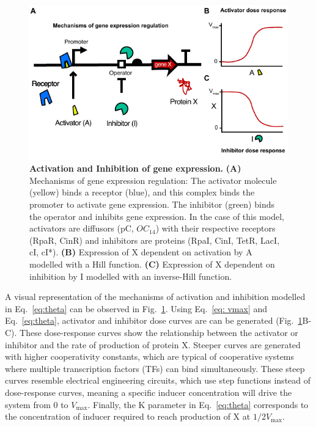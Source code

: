 \begin{figure}[H] %
    \centering
    \begin{adjustbox}{center}
        \includegraphics[width=1\textwidth]{chapters/Chapter 2/activation_inhibition2} %
    \end{adjustbox}
    \caption{\textbf{Activation and Inhibition of gene expression.} \textbf{(A)} Mechanisms of gene expression regulation:
    The activator molecule (yellow) binds a receptor (blue),
        and this complex binds the promoter to activate gene expression.
    The inhibitor (green) binds the operator and inhibits gene expression.
    In the case of this model, activators are diffusors (pC, $OC_{14}$) with their respective receptors (RpaR, CinR) and inhibitors are proteins (RpaI, CinI, TetR, LacI, cI, cI*).
    \textbf{(B)} Expression of X dependent on activation by A modelled with a Hill function.
    \textbf{(C)} Expression of X dependent on inhibition by I modelled with an inverse-Hill function.}
    \label{fig:activation_inhibition} %
\end{figure}

A visual representation of the mechanisms of activation and inhibition
modelled in Eq.~\ref{eq:theta} can be observed in Fig.~\ref{fig:activation_inhibition}.
Using Eq.~\ref{eq: vmax} and Eq.~\ref{eq:theta}, activator and inhibitor dose curves are can be generated
(Fig.~\ref{fig:activation_inhibition}B-C).
These dose-response curves show the relationship between the activator or inhibitor and the rate of production of protein X.
Steeper curves are generated with higher cooperativity constants,
which are typical of cooperative systems where multiple transcription factors (TFs) can bind simultaneously.
These steep curves resemble electrical engineering circuits,
which use step functions instead of dose-response curves,
meaning a specific inducer concentration will drive the system from 0 to $V_{\max}$.
Finally,
the K parameter in Eq.~\ref{eq:theta} corresponds to the concentration of inducer
required to reach production of X at  $1/2 V_{\max}$.


